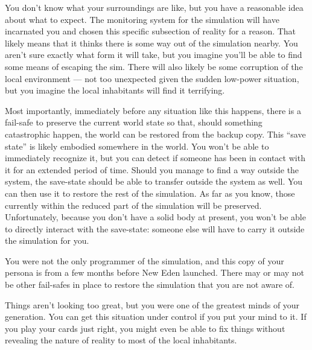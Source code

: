\documentclass[char]{guildcamp1}
\begin{document}
You don't know what your surroundings are like, but you have a reasonable idea about what to expect. The monitoring system for the simulation will have incarnated you and chosen this specific subsection of reality for a reason. That likely means that it thinks there is some way out of the simulation nearby. You aren't sure exactly what form it will take, but you imagine you'll be able to find some means of escaping the sim. There will also likely be some corruption of the local environment --- not too unexpected given the sudden low-power situation, but you imagine the local inhabitants will find it terrifying.

Most importantly, immediately before any situation like this happens, there is a fail-safe to preserve the current world state so that, should something catastrophic happen, the world can be restored from the backup copy. This ``save state'' is likely embodied somewhere in the world. You won't be able to immediately recognize it, but you can detect if someone has been in contact with it for an extended period of time. Should you manage to find a way outside the system, the save-state should be able to transfer outside the system as well. You can then use it to restore the rest of the simulation. As far as you know, those currently within the reduced part of the simulation will be preserved. Unfortunately, because you don't have a solid body at present, you won't be able to directly interact with the save-state: someone else will have to carry it outside the simulation for you.

You were not the only programmer of the simulation, and this copy of your persona is from a few months before New Eden launched. There may or may not be other fail-safes in place to restore the simulation that you are not aware of.

Things aren't looking too great, but you were one of the greatest minds of your generation. You can get this situation under control if you put your mind to it. If you play your cards just right, you might even be able to fix things without revealing the nature of reality to most of the local inhabitants.
\end{document}
